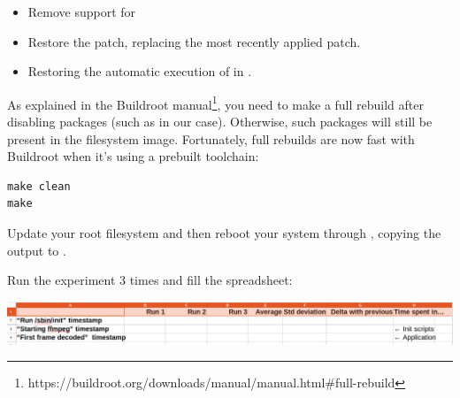 \begin{itemize}
\item Remove support for 
\item Restore the
       patch,
      replacing the most recently applied patch.
\item Restoring the automatic execution of  in
      .
\end{itemize}


As explained in the Buildroot
manual\footnote{https://buildroot.org/downloads/manual/manual.html\#full-rebuild},
you need to make a full rebuild after disabling packages (such as
 in our case). Otherwise, such packages will still be present in the
filesystem image. Fortunately, full rebuilds are now fast with Buildroot
when it's using a prebuilt toolchain:

\begin{verbatim}
make clean
make
\end{verbatim}

Update your root filesystem and then reboot your system through ,
copying the output to .

Run the experiment 3 times and fill the 
spreadsheet:

\includegraphics[width=\textwidth]{labs/boot-time-application/application-optimizations.png}

